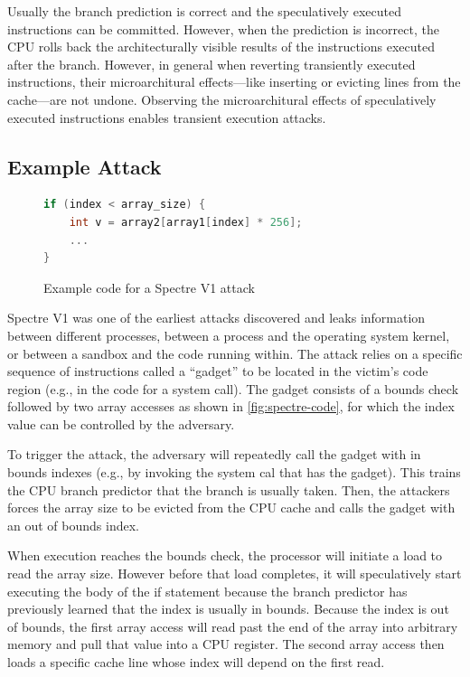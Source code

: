 Usually the branch prediction is correct and the speculatively executed instructions can be committed.
However, when the prediction is incorrect, the CPU rolls back the architecturally visible results of the instructions executed after the branch.
However, in general when reverting transiently executed instructions, their microarchitural effects---like inserting or evicting lines from the cache---are not undone.
Observing the  microarchitural effects of speculatively executed instructions enables transient execution attacks.

\subsection{Example Attack}
\begin{figure}[h]
\begin{lstlisting}[language=C, style=codeStyle]
if (index < array_size) {
    int v = array2[array1[index] * 256];
    ...
}
\end{lstlisting}
\caption{Example code for a Spectre V1 attack}
\label{fig:spectre-code}
\end{figure}
Spectre V1 was one of the earliest attacks discovered and leaks information between different processes, between a process and the operating system kernel, or between a sandbox and the code running within.
The attack relies on a specific sequence of instructions called a ``gadget'' to be located in the victim's code region (e.g., in the code for a system call).
The gadget consists of a bounds check followed by two array accesses as shown in \autoref{fig:spectre-code}, for which the index value can be controlled by the adversary.

To trigger the attack, the adversary will repeatedly call the gadget with in bounds indexes (e.g., by invoking the system cal that has the gadget).
This trains the CPU branch predictor that the branch is usually taken.
Then, the attackers forces the array size to be evicted from the CPU cache and calls the gadget with an out of bounds index.

When execution reaches the bounds check, the processor will initiate a load to read the array size.
However before that load completes, it will speculatively start executing the body of the if statement because the branch predictor has previously learned that the index is usually in bounds.
Because the index is out of bounds, the first array access will read past the end of the array into arbitrary memory and pull that value into a CPU register.
The second array access then loads a specific cache line whose index will depend on the first read.

